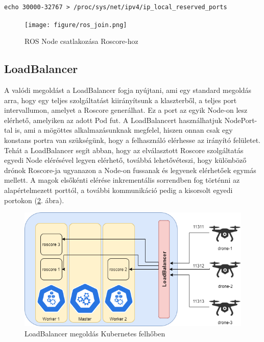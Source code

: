 \begin{lstlisting}[caption={Linuxon kiosztható port korlátozása}, label={lst:portlimit}]
echo 30000-32767 > /proc/sys/net/ipv4/ip_local_reserved_ports
\end{lstlisting}

\begin{figure}
	\centering
	\texttt{[image: figure/ros\_join.png]}
	\caption{ROS Node csatlakozása Roscore-hoz \cite{rosjoin}}
	\label{fig:rosjoin}
\end{figure}

\subsection{LoadBalancer}
A valódi megoldást a LoadBalancer fogja nyújtani, ami egy standard megoldás arra, hogy egy teljes szolgáltatást kiirányítsunk a klaszterből, a teljes port intervallumon, amelyet a Roscore generálhat. Ez a port az egyik Node-on lesz elérhető, amelyiken az adott Pod fut. A LoadBalancert használhatjuk NodePort-tal is, ami a mögöttes alkalmazásunknak megfelel, hiszen onnan csak egy konstans portra van szükségünk, hogy a felhasználó elérhesse az irányító felületet. Tehát a LoadBalancer segít abban, hogy az elválasztott Roscore szolgáltatás egyedi Node elérésével legyen elérhető, továbbá lehetővéteszi, hogy különböző drónok Roscore-ja ugyanazon a Node-on fussanak és legyenek elérhetőek egymás mellett. A magok elsőkénti elérése inkrementális sorrendben fog történni az alapértelmezett porttól, a további kommunikáció pedig a kisorsolt egyedi portokon (\ref{fig:loadbalancer}. ábra). \\

\begin{figure}
	\centering
	\includegraphics[width=\linewidth]{figures/loadBalancer.png}
	\caption{LoadBalancer megoldás Kubernetes felhőben}
	\label{fig:loadbalancer}
\end{figure}


